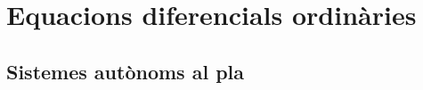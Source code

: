 \documentclass[../Apunts.tex]{subfiles}
\begin{document}
\part{Equacions diferencials ordinàries }
\chapter{Sistemes autònoms al pla}
\end{document}
